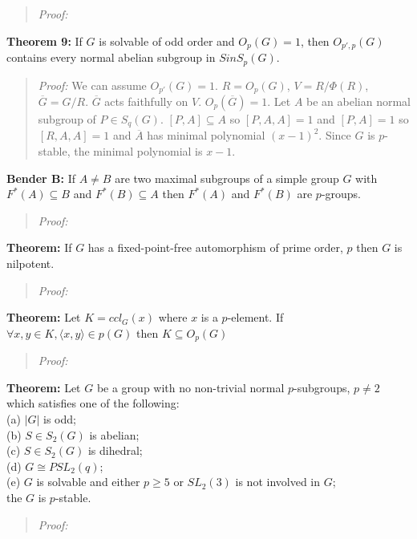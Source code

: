 \begin{quote}
\emph{Proof:}
\end{quote}
{\bf Theorem 9:} If $G$ is solvable of odd order and $O_{p}(G)=1$, then $O_{p', p}(G)$ contains every
normal abelian subgroup in $S in S_p(G)$.
\begin{quote}
\emph{Proof:}
We can assume $O_{p'}(G)=1$. $R= O_p(G)$, $V= R/\Phi(R)$, ${\overline G}= G/R$.
${\overline G}$ acts faithfully on $V$. $O_p({\overline G}) =1$.  Let $A$ be an abelian
normal subgroup of $P \in S_q(G)$. $[P, A] \subseteq A$ so $[P, A, A] = 1$ and $[P, A] =1$
so $[R,A,A]=1$ and ${\overline A}$ has minimal polynomial $(x-1)^2$.  Since $G$ is $p$-stable,
the minimal polynomial is $x-1$.
\end{quote}
{\bf Bender B:} If $A \ne B$ are two maximal subgroups of a simple group $G$ with
$F^*(A) \subseteq B$ and $F^*(B) \subseteq A$ then
$F^*(A)$ and $F^*(B)$ are $p$-groups.
\begin{quote}
\emph{Proof:}
\end{quote}
{\bf Theorem:} If $G$ has a fixed-point-free automorphism of prime order, $p$ then $G$ is nilpotent.
\begin{quote}
\emph{Proof:}
\end{quote}
{\bf Theorem:} Let $K=ccl_G(x)$ where $x$ is a $p$-element.  If $\forall x, y \in K, \langle x , y \rangle \in p(G)$
then $K \subseteq O_p(G)$
\begin{quote}
\emph{Proof:}
\end{quote}
{\bf Theorem:} Let $G$ be a group with no non-trivial normal $p$-subgroups, $p \ne 2$ which satisfies
one of the following:\\
(a) $|G|$ is odd;\\
(b) $S \in S_2(G)$ is abelian;\\
(c) $S \in S_2(G)$ is dihedral;\\
(d) $G \cong PSL_2(q)$;\\
(e)  $G$ is solvable and either $p \geq 5$ or $SL_2(3)$ is not involved in $G$;\\
the $G$ is $p$-stable.
\begin{quote}
\emph{Proof:}
\end{quote}
